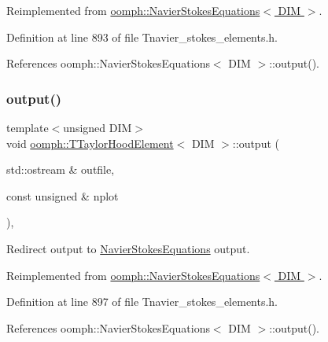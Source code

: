 Reimplemented from \hyperlink{classoomph_1_1NavierStokesEquations_ae2c8742419aae8961eb34dad989c69b9}{oomph\+::\+Navier\+Stokes\+Equations$<$ D\+I\+M $>$}.



Definition at line 893 of file Tnavier\+\_\+stokes\+\_\+elements.\+h.



References oomph\+::\+Navier\+Stokes\+Equations$<$ D\+I\+M $>$\+::output().

\mbox{\label{classoomph_1_1TTaylorHoodElement_a42a3843e4b3ee8e02c6f992b4c0284a8}} 
\subsubsection{\texorpdfstring{output()}{output()}\hspace{0.1cm}{\footnotesize\ttfamily [2/4]}}
{\footnotesize\ttfamily template$<$unsigned D\+IM$>$ \\
void \hyperlink{classoomph_1_1TTaylorHoodElement}{oomph\+::\+T\+Taylor\+Hood\+Element}$<$ D\+IM $>$\+::output (\begin{DoxyParamCaption}\item[{std\+::ostream \&}]{outfile,  }\item[{const unsigned \&}]{nplot }\end{DoxyParamCaption})\hspace{0.3cm}{\ttfamily [inline]}, {\ttfamily [virtual]}}



Redirect output to \hyperlink{classoomph_1_1NavierStokesEquations}{Navier\+Stokes\+Equations} output. 



Reimplemented from \hyperlink{classoomph_1_1NavierStokesEquations_a2bc96a264dad4175d1aca7946db5f303}{oomph\+::\+Navier\+Stokes\+Equations$<$ D\+I\+M $>$}.



Definition at line 897 of file Tnavier\+\_\+stokes\+\_\+elements.\+h.



References oomph\+::\+Navier\+Stokes\+Equations$<$ D\+I\+M $>$\+::output().

\mbox{\label{classoomph_1_1TTaylorHoodElement_af3f6c0194dd358936c610fc81e7ff215}} 
